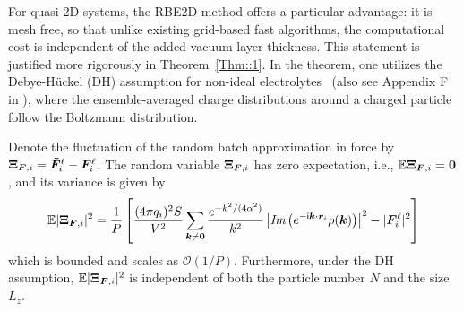 For quasi-2D systems, the RBE2D method offers a particular advantage: it is mesh free, so that unlike existing grid-based fast algorithms, the computational cost is independent   {of the} added vacuum layer thickness. This statement is justified more rigorously in Theorem~\ref{Thm::1}. 
 {In the theorem, one utilizes the Debye-H\"uckel (DH) assumption for non-ideal electrolytes~\cite{levin2002electrostatic} (also see Appendix F in \cite{gan2024fast}), where the ensemble-averaged charge distributions around a charged particle follow the Boltzmann distribution.
}

\begin{thm}\label{Thm::1} 
    Denote the fluctuation of the random batch approximation in force by $\boldsymbol{\Xi}_{\boldsymbol{F},i}=\boldsymbol{\tilde{F}}_i^{\ell}-\boldsymbol{F}_i^{\ell}$. The random variable $\boldsymbol{\Xi}_{\boldsymbol{F},i}$ has zero expectation, i.e., $\mathbb{E}\boldsymbol{\Xi}_{\boldsymbol{F},i}=\boldsymbol{0}$, and its variance is given by
    \begin{equation}\label{eq::30}
        \mathbb{E}|\boldsymbol{\Xi}_{\boldsymbol{F},i}|^2=\frac{1}{P}\left[\frac{(4\pi q_i)^2S}{V^2}\sum_{\bm{k}\neq \bm{0}}\frac{e^{-k^2/(4\alpha^2)}}{k^2}\left|\emph{Im}\left(e^{-\mathsf i \boldsymbol{k} \cdot \boldsymbol{r}_i}\rho(\boldsymbol{k})\right)\right|^2-|\boldsymbol{F}_{i}^{\ell}|^2\right]
    \end{equation}
    which is bounded and scales as $\mathcal O(1/P)$. Furthermore, under the DH assumption, $\mathbb{E}|\boldsymbol{\Xi}_{\boldsymbol{F},i}|^2$ is independent of both the particle number $N$ and the size $L_z$.
\end{thm}

